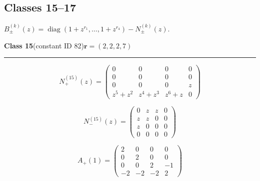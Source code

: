 \subsection*{Classes 15--17}
\noindent $B_\pm^{(k)}(z)=\operatorname{diag}(1+z^{r_1},\ldots,1+z^{r_4})-N_\pm^{(k)}(z)$.\par\medskip
\noindent\begin{minipage}{\linewidth}
\noindent\textbf{Class 15}\quad\small (constant ID 82)\hfill $\symbf{r}=(2,2,2,7)$
\par\smallskip\noindent\textcolor{rulegray}{\rule{\linewidth}{0.3pt}}
\begin{minipage}[c]{0.495\linewidth}\centering\fontsize{9.7}{12}\selectfont
\setlength{\abovedisplayskip}{4pt}\setlength{\belowdisplayskip}{4pt}
\setlength{\abovedisplayshortskip}{4pt}\setlength{\belowdisplayshortskip}{4pt}
\setlength{\arraycolsep}{3pt}\renewcommand{\arraystretch}{1.08}
\[N_{+}^{(15)}(z)=\begin{pmatrix}0 & 0 & 0 & 0\\0 & 0 & 0 & 0\\0 & 0 & 0 & z\\z^{5} + z^{2} & z^{4} + z^{3} & z^{6} + z & 0\end{pmatrix}\]
\end{minipage}%
\begin{minipage}[c]{0.495\linewidth}\centering\fontsize{9.7}{12}\selectfont
\setlength{\abovedisplayskip}{4pt}\setlength{\belowdisplayskip}{4pt}
\setlength{\abovedisplayshortskip}{4pt}\setlength{\belowdisplayshortskip}{4pt}
\setlength{\arraycolsep}{3pt}\renewcommand{\arraystretch}{1.08}
\[N_{-}^{(15)}(z)=\begin{pmatrix}0 & z & z & 0\\z & z & 0 & 0\\z & 0 & 0 & 0\\0 & 0 & 0 & 0\end{pmatrix}\]
\end{minipage}%
\par\noindent
\begin{minipage}[c]{0.495\linewidth}\centering\fontsize{9.7}{12}\selectfont
\setlength{\abovedisplayskip}{4pt}\setlength{\belowdisplayskip}{4pt}
\setlength{\abovedisplayshortskip}{4pt}\setlength{\belowdisplayshortskip}{4pt}
\setlength{\arraycolsep}{3pt}\renewcommand{\arraystretch}{1.08}
\[A_{+}(1)=\begin{pmatrix}2 & 0 & 0 & 0\\0 & 2 & 0 & 0\\0 & 0 & 2 & -1\\-2 & -2 & -2 & 2\end{pmatrix}\]

\end{minipage}
\end{minipage}
